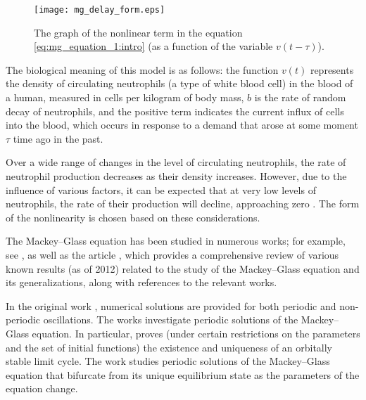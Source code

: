 \begin{figure}
	\centering
	\texttt{[image: mg\_delay\_form.eps]}
	\caption{The graph of the nonlinear term in the equation \eqref{eq:mg_equation_1:intro} (as a function of the variable $v(t - \tau)$).
	}
	\label{fig:mg_delay_form}
\end{figure}


The biological meaning of this model is as follows: the function $v(t)$ represents the density of circulating neutrophils (a type of white blood cell) in the blood of a human, measured in cells per kilogram of body mass, $b$ is the rate of random decay of neutrophils, and the positive term indicates the current influx of cells into the blood, which occurs in response to a demand that arose at some moment $\tau$ time ago in the past.

Over a wide range of changes in the level of circulating neutrophils, the rate of neutrophil production decreases as their density increases. However, due to the influence of various factors, it can be expected that at very low levels of neutrophils, the rate of their production will decline, approaching zero \cite[p. 85]{Mackey1977}. The form of the nonlinearity is chosen based on these considerations.

The Mackey--Glass equation has been studied in numerous works; for example, see \cite{Junges2012, Su2011, Wu2007, Kubyshkin2016, Krisztin2020, Bartha2021}, as well as the article \cite{Berezansky2012}, which provides a comprehensive review of various known results (as of 2012) related to the study of the Mackey--Glass equation and its generalizations, along with references to the relevant works.

In the original work \cite{Mackey1977}, numerical solutions are provided for both periodic and non-periodic oscillations. The works \cite{Krisztin2020, Bartha2021} investigate periodic solutions of the Mackey--Glass equation. In particular, \cite{Bartha2021} proves (under certain restrictions on the parameters and the set of initial functions) the existence and uniqueness of an orbitally stable limit cycle. The work \cite{Kubyshkin2016} studies periodic solutions of the Mackey--Glass equation that bifurcate from its unique equilibrium state as the parameters of the equation change.


